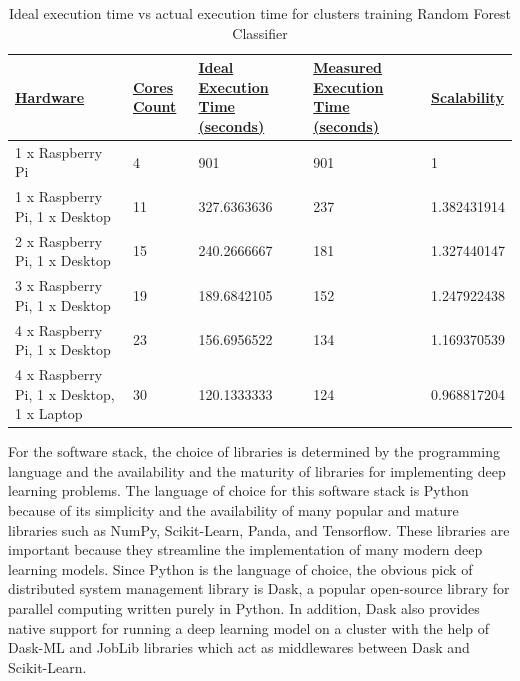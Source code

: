 \documentclass[conference]{IEEEtran}
\begin{document}
        \begin{table}[]
            \begin{tabular}{|l|l|l|l|l|}
            \hline
            {\ul \textbf{Hardware}}                   & {\ul \textbf{Cores Count}} & {\ul \textbf{Ideal Execution Time (seconds)}} & {\ul \textbf{Measured Execution Time (seconds)}} & {\ul \textbf{Scalability}} \\ \hline
            1 x Raspberry Pi                          & 4                          & 901                                           & 901                                              & 1                          \\ \hline
            1 x Raspberry Pi, 1 x Desktop             & 11                         & 327.6363636                                   & 237                                              & 1.382431914                \\ \hline
            2 x Raspberry Pi, 1 x Desktop             & 15                         & 240.2666667                                   & 181                                              & 1.327440147                \\ \hline
            3 x Raspberry Pi, 1 x Desktop             & 19                         & 189.6842105                                   & 152                                              & 1.247922438                \\ \hline
            4 x Raspberry Pi, 1 x Desktop             & 23                         & 156.6956522                                   & 134                                              & 1.169370539                \\ \hline
            4 x Raspberry Pi, 1 x Desktop, 1 x Laptop & 30                         & 120.1333333                                   & 124                                              & 0.968817204                \\ \hline
            \end{tabular}
            \caption{Ideal execution time vs actual execution time for clusters training Random Forest Classifier}
        \end{table}
        
        For the software stack, the choice of libraries is determined by the programming language and the availability and the maturity of libraries for implementing deep learning problems. The language of choice for this software stack is Python because of its simplicity and the availability of many popular and mature libraries such as NumPy, Scikit-Learn, Panda, and Tensorflow. These libraries are important because they streamline the implementation of many modern deep learning models. Since Python is the language of choice, the obvious pick of distributed system management library is Dask, a popular open-source library for parallel computing written purely in Python. In addition, Dask also provides native support for running a deep learning model on a cluster with the help of Dask-ML and JobLib libraries which act as middlewares between Dask and Scikit-Learn. 
\end{document}
